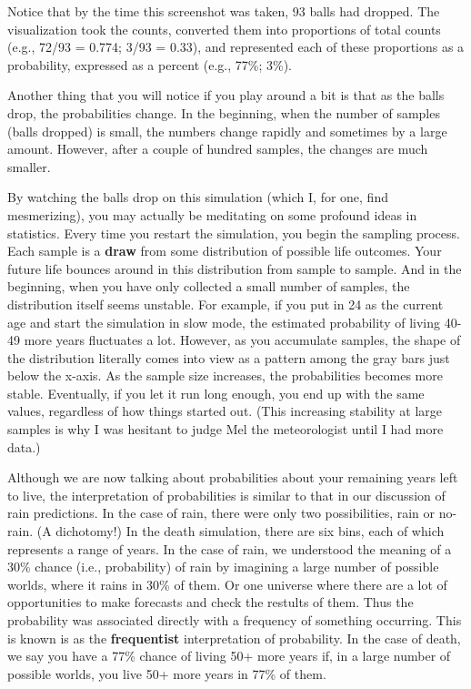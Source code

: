 \documentclass[openany]{book}
\begin{document}
Notice that by the time this screenshot was taken, 93 balls had dropped. The visualization took the counts, converted them into proportions of total counts (e.g., 72/93 = 0.774; 3/93 = 0.33), and represented each of these proportions as a probability, expressed as a percent (e.g., 77\%; 3\%).

Another thing that you will notice if you play around a bit is that as the balls drop, the probabilities change. In the beginning, when the number of samples (balls dropped) is small, the numbers change rapidly and sometimes by a large amount. However, after a couple of hundred samples, the changes are much smaller.

By watching the balls drop on this simulation (which I, for one, find mesmerizing), you may actually be meditating on some profound ideas in statistics. Every time you restart the simulation, you begin the sampling process. Each sample is a \textbf{draw} from some distribution of possible life outcomes. Your future life bounces around in this distribution from sample to sample. And in the beginning, when you have only collected a small number of samples, the distribution itself seems unstable. For example, if you put in 24 as the current age and start the simulation in slow mode, the estimated probability of living 40-49 more years fluctuates a lot. However, as you accumulate samples, the shape of the distribution literally comes into view as a pattern among the gray bars just below the x-axis. As the sample size increases, the probabilities becomes more stable. Eventually, if you let it run long enough, you end up with the same values, regardless of how things started out. (This increasing stability at large samples is why I was hesitant to judge Mel the meteorologist until I had more data.)

Although we are now talking about probabilities about your remaining years left to live, the interpretation of probabilities is similar to that in our discussion of rain predictions. In the case of rain, there were only two possibilities, rain or no-rain. (A dichotomy!) In the death simulation, there are six bins, each of which represents a range of years. In the case of rain, we understood the meaning of a 30\% chance (i.e., probability) of rain by imagining a large number of possible worlds, where it rains in 30\% of them. Or one universe where there are a lot of opportunities to make forecasts and check the restults of them. Thus the probability was associated directly with a frequency of something occurring. This is known is as the \textbf{frequentist} interpretation of probability. In the case of death, we say you have a 77\% chance of living 50+ more years if, in a large number of possible worlds, you live 50+ more years in 77\% of them.
\end{document}
